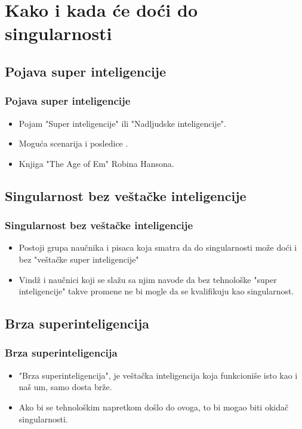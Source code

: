 \documentclass{beamer}
\begin{document}
\section{Kako i kada će doći do singularnosti}
\subsection{Pojava super inteligencije}
\begin{frame}[fragile]\frametitle{Pojava super inteligencije}
	\begin{itemize}	
		\item Pojam "Super inteligencije" ili "Nadljudske inteligencije".
        \item Moguća scenarija i posledice .
        \item Knjiga "The Age of Em" Robina Hansona.
	\end{itemize}
\end{frame}

\subsection{Singularnost bez veštačke inteligencije}
\begin{frame}[fragile]\frametitle{Singularnost bez veštačke inteligencije}
	\begin{itemize}	
        \item Postoji grupa naučnika i pisaca koja smatra da do singularnosti može doći i bez "veštačke super inteligencije"
        \item Vindž i naučnici koji se slažu sa njim navode da bez tehnološke "super inteligencije" takve promene ne bi mogle da se kvalifikuju kao singularnost.
	\end{itemize}
\end{frame}

\subsection{Brza superinteligencija}
\begin{frame}[fragile]\frametitle{Brza superinteligencija}
	\begin{itemize}	
        \item "Brza superinteligencija", je veštačka inteligencija koja funkcioniše isto kao i naš um, samo dosta brže.
        \item Ako bi se tehnološkim napretkom došlo do ovoga, to bi mogao biti okidač singularnosti.
	\end{itemize}
\end{frame}
\end{document}
